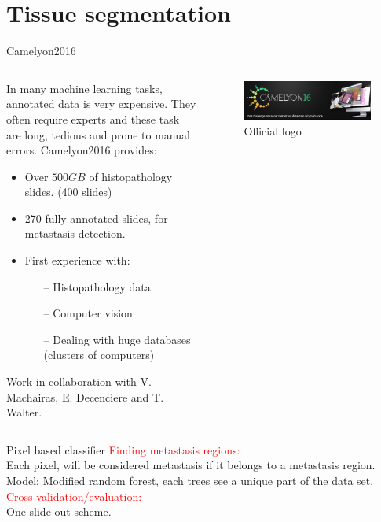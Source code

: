 \documentclass{beamer}
\begin{document}
\section{Tissue segmentation}
\begin{frame}{Camelyon2016}

\begin{columns}[T] %
\begin{column}{.7\textwidth}
In many machine learning tasks, annotated data is very expensive. They often require experts and these task are long, tedious and prone to manual errors. Camelyon2016 provides:
\begin{itemize}
\item Over $500 GB$ of histopathology slides. (400 slides)
\item 270 fully annotated slides, for metastasis detection.
\item First experience with:
\begin{itemize}
\item [--] Histopathology data
\item [--] Computer vision
\item [--] Dealing with huge databases (clusters of computers)
\end{itemize} 
\end{itemize}
Work in collaboration with V. Machairas, E. Decenciere and T. Walter.
\end{column}%
\hfill%
\begin{column}{.3\textwidth}
\begin{figure}[!ht]
\centering
\includegraphics[width=1.3\textwidth]{Camelyon16.png}
\caption{Official logo}
\label{}
\end{figure}
\end{column}%
\end{columns}
\end{frame}

\begin{frame}{Pixel based classifier}
\textcolor{red}{Finding metastasis regions:}\\
Each pixel, will be considered metastasis if it belongs to a metastasis region. \\
Model: Modified random forest, each trees see a unique part of the data set. \\

\textcolor{red}{Cross-validation/evaluation:} \\
One slide out scheme.
\end{frame}
\end{document}
